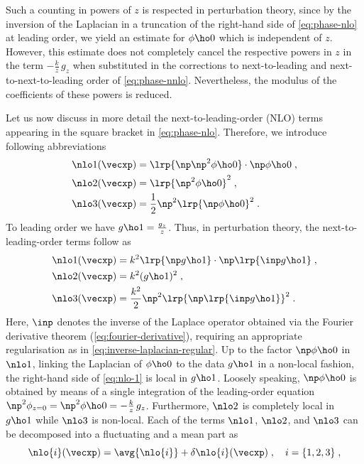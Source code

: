 \documentclass[
twoside,
openright,
titlepage,
numbers=noenddot,
headinclude,
fleqn,
a4paper,
footinclude=true,
cleardoublepage=empty,
abstractoff,
BCOR=5mm,
paper=a4,
fontsize=11pt,
british,ngerman,american,
]{scrreprt}
\begin{document}
Such a counting in powers of $z$ is respected in perturbation theory,
since by the inversion of the Laplacian in a truncation of the
right-hand side of \cref{eq:phase-nlo} at leading order, we yield an
estimate for $\phi\ho0$ which is independent of $z$.  However, this
estimate does not completely cancel the respective powers in $z$ in
the term $-\frac{k}{z}\,g_z$ when substituted in the corrections to
next-to-leading and next-to-next-to-leading order of
\cref{eq:phase-nnlo}.  Nevertheless, the modulus of the coefficients
of these powers is reduced.

Let us now discuss in more detail the next-to-leading-order (NLO)
terms appearing in the square bracket in \cref{eq:phase-nlo}.
Therefore, we introduce following abbreviations
\begin{equation}
  \label{eq:nlo}
  \begin{split}
       \nlo1(\vecxp) &= \lrp{\np\np^2\phi\ho0}\cdot\np\phi\ho0 \;,
    \\ \nlo2(\vecxp) &= \lrp{\np^2\phi\ho0}^2 \;,
    \\ \nlo3(\vecxp) &= \frac12\np^2\lrp{\np\phi\ho0}^2 \;.
  \end{split}
\end{equation}
To leading order we have $g\ho1=\frac{g_z}{z}$.  Thus, in perturbation
theory, the next-to-leading-order terms follow as
\begin{align}
  \label{eq:nlo-1}
  \nlo1(\vecxp) &= k^2 \lrp{\np g\ho1}\cdot\np\lrp{\inp g\ho1} \;,
  \\ \label{eq:nlo-2} 
  \nlo2(\vecxp) &= k^2 (g\ho1)^2 \;,
  \\ \label{eq:nlo-3} 
  \nlo3(\vecxp) &= \frac{k^2}{2}\np^2\lrp{\np\lrp{\inp g\ho1}}^2 \;.
\end{align}
Here, $\inp$ denotes the inverse of the Laplace operator obtained via
the Fourier derivative theorem (\cref{eq:fourier-derivative}),
requiring an appropriate regularisation as in
\cref{eq:inverse-laplacian-regular}.  Up to the factor $\np\phi\ho0$
in $\nlo1$, linking the Laplacian of $\phi\ho0$ to the data $g\ho1$ in
a non-local fashion, the right-hand side of \cref{eq:nlo-1} is local
in $g\ho1$.  Loosely speaking, $\np\phi\ho0$ is obtained by means of a
single integration of the leading-order equation
$\np^2\phi_{z=0}=\np^2\phi\ho0=-\frac{k}{z}\,g_z$.  Furthermore,
$\nlo2$ is completely local in $g\ho1$ while $\nlo3$ is non-local.
Each of the terms $\nlo1$, $\nlo2$, and $\nlo3$ can be decomposed into
a fluctuating and a mean part as
\begin{equation}
  \label{eq:nlo-decomposition}
  \nlo{i}(\vecxp) = 
  \avg{\nlo{i}} +\delta\nlo{i}(\vecxp)\;, \quad i=\{1,2,3\} \;,
\end{equation}
\end{document}
